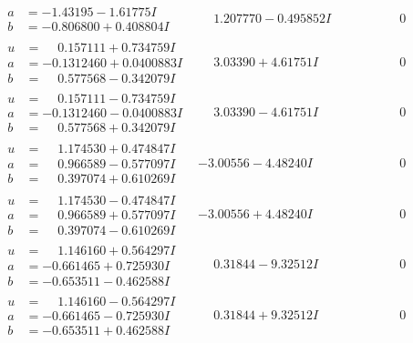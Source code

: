\documentclass[1p]{elsarticle_modified}
\theoremstyle{definition}
\begin{document}
$$\begin{array}{c|c|c}
\begin{aligned}
a &= -1.43195 - 1.61775 I \\
b &= -0.806800 + 0.408804 I\end{aligned}
 & \phantom{-}1.207770 - 0.495852 I & \phantom{-0.000000 } 0 \\ \hline\begin{aligned}
u &= \phantom{-}0.157111 + 0.734759 I \\
a &= -0.1312460 + 0.0400883 I \\
b &= \phantom{-}0.577568 - 0.342079 I\end{aligned}
 & \phantom{-}3.03390 + 4.61751 I & \phantom{-0.000000 } 0 \\ \hline\begin{aligned}
u &= \phantom{-}0.157111 - 0.734759 I \\
a &= -0.1312460 - 0.0400883 I \\
b &= \phantom{-}0.577568 + 0.342079 I\end{aligned}
 & \phantom{-}3.03390 - 4.61751 I & \phantom{-0.000000 } 0 \\ \hline\begin{aligned}
u &= \phantom{-}1.174530 + 0.474847 I \\
a &= \phantom{-}0.966589 - 0.577097 I \\
b &= \phantom{-}0.397074 + 0.610269 I\end{aligned}
 & -3.00556 - 4.48240 I & \phantom{-0.000000 } 0 \\ \hline\begin{aligned}
u &= \phantom{-}1.174530 - 0.474847 I \\
a &= \phantom{-}0.966589 + 0.577097 I \\
b &= \phantom{-}0.397074 - 0.610269 I\end{aligned}
 & -3.00556 + 4.48240 I & \phantom{-0.000000 } 0 \\ \hline\begin{aligned}
u &= \phantom{-}1.146160 + 0.564297 I \\
a &= -0.661465 + 0.725930 I \\
b &= -0.653511 - 0.462588 I\end{aligned}
 & \phantom{-}0.31844 - 9.32512 I & \phantom{-0.000000 } 0 \\ \hline\begin{aligned}
u &= \phantom{-}1.146160 - 0.564297 I \\
a &= -0.661465 - 0.725930 I \\
b &= -0.653511 + 0.462588 I\end{aligned}
 & \phantom{-}0.31844 + 9.32512 I & \phantom{-0.000000 } 0 \\ \hline\begin{aligned}

\end{aligned}
\end{array}$$
\end{document}
